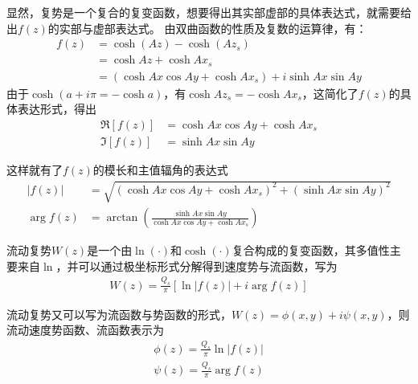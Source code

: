 显然，复势是一个复合的复变函数，想要得出其实部虚部的具体表达式，就需要给出$f(z)$的实部与虚部表达式。
由双曲函数的性质及复数的运算律，有：
\begin{align*}
    f(z)&=\cosh (Az)-\cosh (Az_{s})\\
        &=\cosh Az+\cosh Ax_{s}\\
        &=(\cosh Ax\cos Ay+\cosh Ax_{s})+i \sinh Ax\sin Ay
\end{align*}
由于$\cosh(a+i\pi=-\cosh a)$，有$\cosh Az_{s}=-\cosh Ax_{s}$，这简化了$f(z)$的具体表达形式，得出
\begin{align}
    \Re [f(z)]&=\cosh Ax\cos Ay+\cosh Ax_{s}\\
    \Im [f(z)]&=\sinh Ax\sin Ay
\end{align}

这样就有了$f(z)$的模长和主值辐角的表达式
\begin{align}
    |f(z)|&=\sqrt{(\cosh Ax\cos Ay+\cosh Ax_{s})^{2}+(\sinh Ax\sin Ay)^{2}}\\
    \arg f(z) &= \arctan\left(\frac{\sinh Ax\sin Ay}{\cosh Ax\cos Ay+\cosh Ax_{s}}\right)
\end{align}

流动复势$W(z)$是一个由$\ln(\cdot)$和$\cosh(\cdot)$复合构成的复变函数，其多值性主要来自$\ln$，并可以通过极坐标形式分解得到速度势与流函数，写为
\begin{align}
    W(z)=\frac{Q_{s}}{\pi}[\ln|f(z)|+i\arg f(z)]
\end{align}


流动复势又可以写为流函数与势函数的形式，$W(z)=\phi(x,y)+i\psi(x,y)$，则流动速度势函数、流函数表示为
\begin{align}
    \phi(z) = \frac{Q_{s}}{\pi}\ln|f(z)|\\
    \psi(z) = \frac{Q_{s}}{\pi}\arg f(z)
\end{align}





